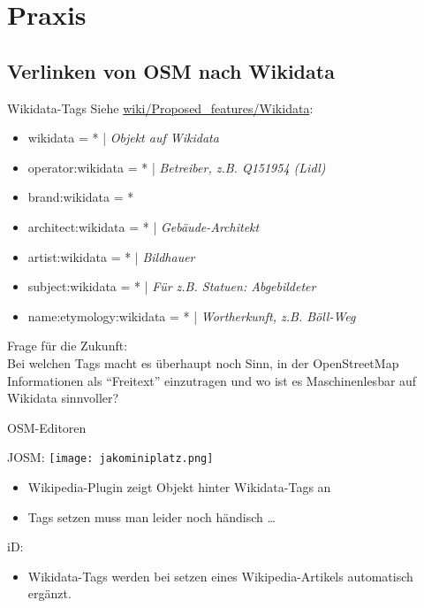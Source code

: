 \documentclass{beamer}
\begin{document}
\section{Praxis}

\subsection{Verlinken von OSM nach Wikidata}

\begin{frame}{Wikidata-Tags}
  Siehe \href{https://wiki.openstreetmap.org/wiki/Proposed\_features/Wikidata}{wiki/Proposed\_features/Wikidata}:
  \begin{itemize}
    \item wikidata = * | \emph{Objekt auf Wikidata} \pause
    \item operator:wikidata = * | \emph{Betreiber, z.B. Q151954 (Lidl) }
    \item brand:wikidata = * 
    \item architect:wikidata = * | \emph{Gebäude-Architekt}
    \item artist:wikidata = * | \emph{Bildhauer}
    \item subject:wikidata = * | \emph{Für z.B. Statuen: Abgebildeter}
    \item name:etymology:wikidata = * | \emph{Wortherkunft, z.B. Böll-Weg}
  \end{itemize}

  \pause
  Frage für die Zukunft: \\
  Bei welchen Tags macht es überhaupt noch Sinn, in der OpenStreetMap Informationen als "`Freitext"' einzutragen und wo ist es Maschinenlesbar auf Wikidata sinnvoller?

\end{frame}

\begin{frame}{OSM-Editoren}

  JOSM: \hfill \texttt{[image: jakominiplatz.png]}

  \begin{itemize}
    \item Wikipedia-Plugin zeigt Objekt hinter Wikidata-Tags an 
    \item Tags setzen muss man leider noch händisch \dots
  \end{itemize}

  \pause
  iD:
  \begin{itemize}
    \item Wikidata-Tags werden bei setzen eines Wikipedia-Artikels automatisch ergänzt.
  \end{itemize}

\end{frame}
\end{document}
